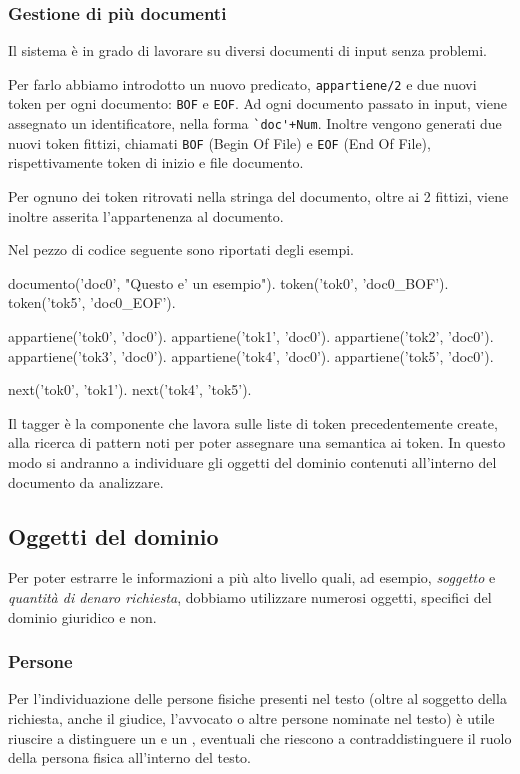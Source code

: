 \subsubsection{Gestione di più documenti}
Il sistema è in grado di lavorare su diversi documenti di input senza problemi.

Per farlo abbiamo introdotto un nuovo predicato, \verb+appartiene/2+ e due nuovi token per ogni documento: \verb+BOF+ e \verb+EOF+.
Ad ogni documento passato in input, viene assegnato un identificatore, nella forma \verb:`doc'+Num:. Inoltre vengono generati due nuovi token fittizi, chiamati \verb+BOF+ (Begin Of File) e \verb+EOF+ (End Of File), rispettivamente token di inizio e file documento.

Per ognuno dei token ritrovati nella stringa del documento, oltre ai 2 fittizi, viene inoltre asserita l'appartenenza al documento.

Nel pezzo di codice seguente sono riportati degli esempi.

\begin{prologcode}
documento('doc0', "Questo e' un esempio").
token('tok0', 'doc0_BOF').
token('tok5', 'doc0_EOF').

appartiene('tok0', 'doc0').
appartiene('tok1', 'doc0').
appartiene('tok2', 'doc0').
appartiene('tok3', 'doc0').
appartiene('tok4', 'doc0').
appartiene('tok5', 'doc0').

next('tok0', 'tok1').
next('tok4', 'tok5').
\end{prologcode}


Il tagger è la componente che lavora sulle liste di token precedentemente create, alla ricerca di pattern noti per poter assegnare una semantica ai token. In questo modo si andranno a individuare gli oggetti del dominio contenuti all'interno del documento da analizzare.

\subsection{Oggetti del dominio}
Per poter estrarre le informazioni a più alto livello quali, ad esempio, \emph{soggetto} e \emph{quantità di denaro richiesta}, dobbiamo utilizzare numerosi oggetti, specifici del dominio giuridico e non.

\subsubsection{Persone}
Per l'individuazione delle persone fisiche presenti nel testo (oltre al soggetto della richiesta, anche il giudice, l'avvocato o altre persone nominate nel testo) è utile riuscire a distinguere un  e un , eventuali  che riescono a contraddistinguere il ruolo della persona fisica all'interno del testo.

